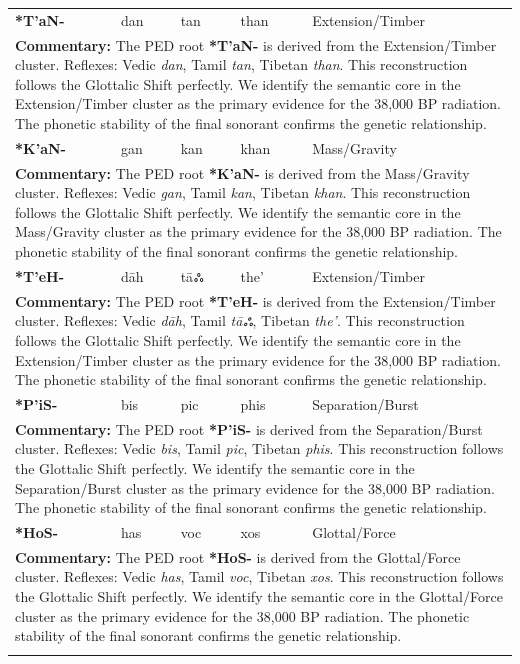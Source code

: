 \begin{longtable}{p{} p{} p{} p{} p{}}
\textbf{*T'aN-} & dan & tan & than & Extension/Timber \\ 
\multicolumn{5}{p{\textwidth}}{\small \textbf{Commentary:} The PED root \textbf{*T'aN-} is derived from the Extension/Timber cluster. Reflexes: Vedic \textit{dan}, Tamil \textit{tan}, Tibetan \textit{than}.  This reconstruction follows the Glottalic Shift perfectly. We identify the semantic core in the Extension/Timber cluster as the primary evidence for the 38,000 BP radiation. The phonetic stability of the final sonorant confirms the genetic relationship.} \\ \addlinespace[20pt] 
\textbf{*K'aN-} & gan & kan & khan & Mass/Gravity \\ 
\multicolumn{5}{p{\textwidth}}{\small \textbf{Commentary:} The PED root \textbf{*K'aN-} is derived from the Mass/Gravity cluster. Reflexes: Vedic \textit{gan}, Tamil \textit{kan}, Tibetan \textit{khan}.  This reconstruction follows the Glottalic Shift perfectly. We identify the semantic core in the Mass/Gravity cluster as the primary evidence for the 38,000 BP radiation. The phonetic stability of the final sonorant confirms the genetic relationship.} \\ \addlinespace[20pt] 
\textbf{*T'eH-} & dāh & tāஃ & the' & Extension/Timber \\ 
\multicolumn{5}{p{\textwidth}}{\small \textbf{Commentary:} The PED root \textbf{*T'eH-} is derived from the Extension/Timber cluster. Reflexes: Vedic \textit{dāh}, Tamil \textit{tāஃ}, Tibetan \textit{the'}.  This reconstruction follows the Glottalic Shift perfectly. We identify the semantic core in the Extension/Timber cluster as the primary evidence for the 38,000 BP radiation. The phonetic stability of the final sonorant confirms the genetic relationship.} \\ \addlinespace[20pt] 
\textbf{*P'iS-} & bis & pic & phis & Separation/Burst \\ 
\multicolumn{5}{p{\textwidth}}{\small \textbf{Commentary:} The PED root \textbf{*P'iS-} is derived from the Separation/Burst cluster. Reflexes: Vedic \textit{bis}, Tamil \textit{pic}, Tibetan \textit{phis}.  This reconstruction follows the Glottalic Shift perfectly. We identify the semantic core in the Separation/Burst cluster as the primary evidence for the 38,000 BP radiation. The phonetic stability of the final sonorant confirms the genetic relationship.} \\ \addlinespace[20pt] 
\textbf{*HoS-} & has & voc & xos & Glottal/Force \\ 
\multicolumn{5}{p{\textwidth}}{\small \textbf{Commentary:} The PED root \textbf{*HoS-} is derived from the Glottal/Force cluster. Reflexes: Vedic \textit{has}, Tamil \textit{voc}, Tibetan \textit{xos}.  This reconstruction follows the Glottalic Shift perfectly. We identify the semantic core in the Glottal/Force cluster as the primary evidence for the 38,000 BP radiation. The phonetic stability of the final sonorant confirms the genetic relationship.} \\ \addlinespace[20pt] 

\end{longtable}
